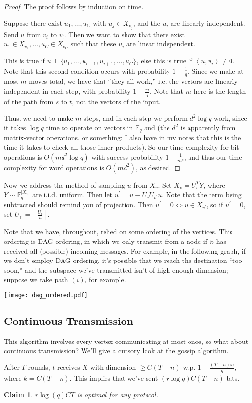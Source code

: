 \documentclass[11pt]{article}
\newcommand{\F}{\mathbb{F}}
\newtheorem{claim}[theorem]{Claim}
\begin{document}
\begin{proof}
The proof follows by induction on time.

Suppose there exist $u_1, \dots, u_C$ with $u_j \in X_{v_j}$, and the $u_i$ are linearly independent. Send $u$ from $v_i$ to $v_i^\prime$. Then we want to show that there exist $u_1 \in X_{v_1}, \dots, u_C \in X_{v_C}$ such that these $u_i$ are linear independent.

This is true if $u \perp \{u_1, \ldots, u_{i-1}, u_{i+1}, \ldots, u_C \}$, else this is true if $\left< u, u_i \right> \neq 0$. Note that this second condition occurs with probability $1 - \frac{1}{q}$.  Since we make at most $m$ moves total, we have that ``they all work,'' i.e. the vectors are linearly independent in each step, with probability $1 - \frac{m}{q}$. Note that $m$ here is the length of the path from $s$ to $t$, not the vectors of the input.

Thus, we need to make $m$ steps, and in each step we perform $d^2\log q$ work, since it takes $\log q$ time to operate on vectors in $\F_q$ and (the $d^2$ is apparently from matrix-vector operations, or something; I also have in my notes that this is the time it takes to check all those inner products).  So our time complexity for bit operations is $O(md^2 \log q)$ with success probability $1 - \frac{1}{m^c}$, and thus our time complexity for word operations is $O(md^2)$, as desired.
\end{proof}

Now we address the method of sampling $u$ from $X_v$. Set $X_v = U_v^TY$, where $Y \sim \F_q^{|X_v|}$ are i.i.d. uniform. Then let $u^\prime = u - U_vU_{v^\prime}u$. Note that the term being subtracted should remind you of projection. Then $u^\prime = 0 \iff u \in X_{v^\prime}$, so if $u^\prime = 0$, set $U_{v^\prime} = \left[\frac{U_v}{u}\right]$.

Note that we have, throughout, relied on some ordering of the vertices. This ordering is DAG ordering, in which we only transmit from a node if it has received all (possible) incoming messages. For example, in the following graph, if we don't employ DAG ordering, it's possible that we reach the destination ``too soon,'' and the subspace we've transmitted isn't of high enough dimension; suppose we take path $(i)$, for example.

\begin{center}
\texttt{[image: dag\_ordered.pdf]}
\end{center}

\subsection{Continuous Transmission}

This algorithm involves every vertex communicating at most once, so what about continuous transmission?  We'll give a cursory look at the gossip algorithm.

After $T$ rounds, $t$ receives $X$ with dimension $\geq C(T-n)$ w.p. $1 - \frac{(T - n)m}{q}$, where $k = C(T-n)$. This implies that we've sent $(r\log q)C(T-n)$ bits.

\begin{claim}
$r\log(q) CT$ is optimal for any protocol.
\end{claim}
\end{document}

